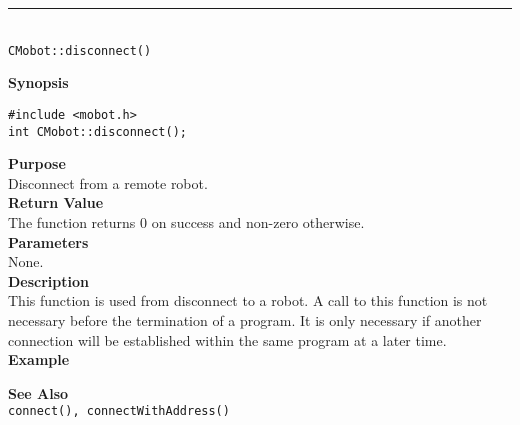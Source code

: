 \noindent
\vspace{5pt}
\rule{4.5in}{0.015in}\\
\noindent
{\LARGE \texttt{CMobot::disconnect()}}\\
{}

\noindent
{\bf Synopsis}
\vspace{-8pt}
\begin{verbatim}
#include <mobot.h>
int CMobot::disconnect();
\end{verbatim}

\noindent
{\bf Purpose}\\
Disconnect from a remote robot.\\

\noindent
{\bf Return Value}\\
The function returns 0 on success and non-zero otherwise.\\

\noindent
{\bf Parameters}\\
None.\\

\noindent
{\bf Description}\\
This function is used from disconnect to a robot. A call to this function is
not necessary before the termination of a program. It is only necessary if
another connection will be established within the same program at a later time.
\\

\noindent
{\bf Example}\\
\noindent

\noindent
{\bf See Also}\\
\texttt{connect(), connectWithAddress()}

